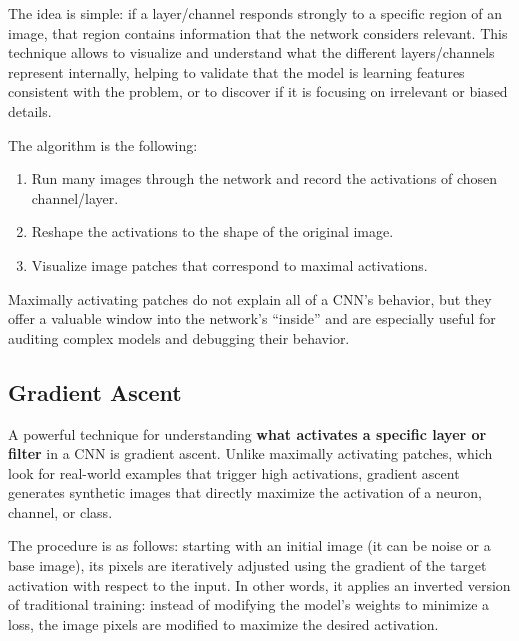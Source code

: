 The idea is simple: if a layer/channel responds strongly to a specific region of an image, that region contains information that the network considers relevant. This technique allows to visualize and understand what the different layers/channels represent internally, helping to validate that the model is learning features consistent with the problem, or to discover if it is focusing on irrelevant or biased details.

The algorithm is the following:
\begin{enumerate}
\item Run many images through the network and record the activations of chosen channel/layer.
\item Reshape the activations to the shape of the original image.
\item Visualize image patches that correspond to maximal activations.
\end{enumerate}

Maximally activating patches do not explain all of a CNN's behavior, but they offer a valuable window into the network's ``inside'' and are especially useful for auditing complex models and debugging their behavior.

\subsection{Gradient Ascent}

A powerful technique for understanding \textbf{what activates a specific layer or filter} in a CNN is gradient ascent. Unlike maximally activating patches, which look for real-world examples that trigger high activations, gradient ascent generates synthetic images that directly maximize the activation of a neuron, channel, or class.

The procedure is as follows: starting with an initial image (it can be noise or a base image), its pixels are iteratively adjusted using the gradient of the target activation with respect to the input. In other words, it applies an inverted version of traditional training: instead of modifying the model's weights to minimize a loss, the image pixels are modified to maximize the desired activation.

